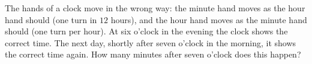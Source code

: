 The hands of a clock move in the wrong way: the minute hand moves as the hour hand should (one turn in $12$ hours), and the hour hand moves as the minute hand should (one turn per hour). At six o'clock in the evening the clock shows the correct time. The next day, shortly after seven o'clock in the morning, it shows the correct time again. How many minutes after seven o'clock does this happen?
